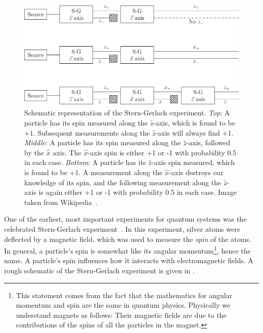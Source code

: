 \begin{figure}
  \centering
  \includegraphics[width=\linewidth]{figs/stern-gerlach.png}
  \caption{Schematic representation of the Stern-Gerlach experiment.
           {\it Top}: A particle has its spin measured along the $\hat{z}$-axis,
which is found to be $+1$. Subsequent measurements along the $\hat{z}$-axis 
will always find +1. {\it Middle}: A particle has its spin measured along the
$\hat{z}$-axis, followed by the $\hat{x}$ axis. The $\hat{x}$-axis spin is
either +1 or -1 with probability 0.5 in each case. {\it Bottom}: A particle has
its $\hat{z}$-axis spin measured, which is found to be +1. A measurement along
the $\hat{x}$-axis destroys our knowledge of its spin, and the following
measurement along the $\hat{z}$-axis is again either +1 or -1 with probability
0.5 in each case. Image taken from Wikipedia~\cite{wiki:SG}. }
  \label{fig:sternGerlach}
\end{figure}

One of the earliest, most important experiments for quantum systems 
was the celebrated Stern-Gerlach
experiment~\cite{gerlach_experimentelle_1922a,gerlach_magnetische_1922b,gerlach_experimentelle_1922c}.
In this experiment, silver atoms were deflected by a magnetic field, which was
used to measure the {\it spin} of the atoms. In general, a
particle's spin is somewhat like its angular momentum\footnote{This statement
comes from the fact that the mathematics for angular momentum and spin are the
same in quantum physics. Physically we understand magnets as follows: Their
magnetic fields are due to the contributions of the spins of all the particles
in the magnet.}, hence the name. A particle's spin influences how it 
interacts with electromagnetic fields. A rough schematic of the Stern-Gerlach
experiment is given in .

